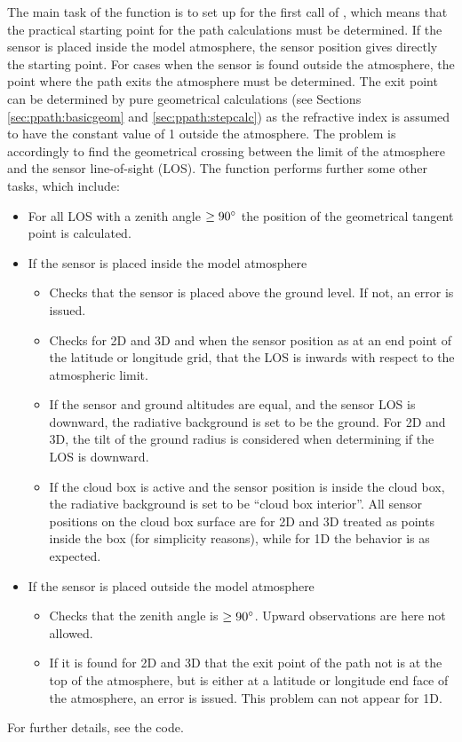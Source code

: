 The main task of the function  is to
set up  for the first call of
, which means that the practical
starting point for the path calculations must be determined. If the
sensor is placed inside the model atmosphere, the sensor position
gives directly the starting point. For cases when the sensor is found
outside the atmosphere, the point where the path exits the atmosphere
must be determined. The exit point can be determined by pure
geometrical calculations (see Sections \ref{sec:ppath:basicgeom} and
\ref{sec:ppath:stepcalc}) as the refractive index is assumed to have the
constant value of 1 outside the atmosphere. The problem is accordingly
to find the geometrical crossing between the limit of the atmosphere
and the sensor line-of-sight (LOS). The function performs further some
other tasks, which include:
\begin{itemize}
\item For all LOS with a zenith angle $\geq 90^\circ$ the position of
  the geometrical tangent point is calculated.
\item If the sensor is placed inside the model atmosphere
  \begin{itemize}
  \item Checks that the sensor is placed above the ground level. If
    not, an error is issued.
  \item Checks for 2D and 3D and when the sensor position as at an end
    point of the latitude or longitude grid, that the LOS is inwards
    with respect to the atmospheric limit.
  \item If the sensor and ground altitudes are equal, and the sensor
    LOS is downward, the radiative background is set to be the
    ground. For 2D and 3D, the tilt of the ground radius is considered
    when determining if the LOS is downward.
  \item If the cloud box is active and the sensor position is inside
    the cloud box, the radiative background is set to be ``cloud box
    interior''. All sensor positions on the cloud box surface are for
    2D and 3D treated as points inside the box (for simplicity
    reasons), while for 1D the behavior is as expected.
  \end{itemize}
\item If the sensor is placed outside the model atmosphere
  \begin{itemize}
  \item Checks that the zenith angle is $\geq  90^\circ$.  Upward
    observations are here not allowed.
  \item If it is found for 2D and 3D that the exit point of the path
    not is at the top of the atmosphere, but is either at a latitude
    or longitude end face of the atmosphere, an error is issued. This
    problem can not appear for 1D.
  \end{itemize}
\end{itemize}
For further details, see the code.


